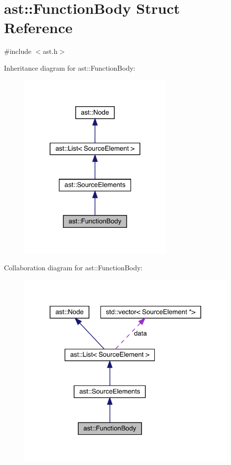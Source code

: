 \hypertarget{structast_1_1_function_body}{}\section{ast\+:\+:Function\+Body Struct Reference}
\label{structast_1_1_function_body}


{\ttfamily \#include $<$ast.\+h$>$}



Inheritance diagram for ast\+:\+:Function\+Body\+:
\nopagebreak
\begin{figure}[H]
\begin{center}
\leavevmode
\includegraphics[width=216pt]{structast_1_1_function_body__inherit__graph}
\end{center}
\end{figure}


Collaboration diagram for ast\+:\+:Function\+Body\+:
\nopagebreak
\begin{figure}[H]
\begin{center}
\leavevmode
\includegraphics[width=308pt]{structast_1_1_function_body__coll__graph}
\end{center}
\end{figure}
